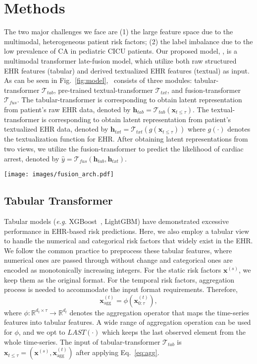 \section{Methods}
The two major challenges we face are (1) the large feature space due to the multimodal, heterogeneous patient risk factors; (2) the label imbalance due to the low prevalence of CA in pediatric CICU patients.  
Our proposed model, \modelname, is a multimodal transformer late-fusion model, which utilize both raw structured EHR features (tabular) and derived textualized EHR features (textual) as input. As can be seen in Fig.~\ref{fig:model}, \modelname ~consists of three modules: tabular-transformer $\mathcal{T}_{tab}$, pre-trained textual-transformer $\mathcal{T}_{txt}$, and fusion-transformer $\mathcal{T}_{fus}$. The tabular-transformer is corresponding to obtain latent representation from patient's raw EHR data, denoted by $\mathbf{h}_{tab}=\mathcal{T}_{tab}(\mathbf{x}_{t\leq \tau})$. The textual-transformer is corresponding to obtain latent representation from patient's textualized EHR data, denoted by $\mathbf{h}_{txt}=\mathcal{T}_{txt}(g(\mathbf{x}_{t\leq \tau}))$ where $g(\cdot)$ denotes the textualization function for EHR. After obtaining latent representations from two views, we utilize the fusion-transformer to predict the likelihood of cardiac arrest, denoted by $\hat{y}=\mathcal{T}_{fus}(\mathbf{h}_{tab},\mathbf{h}_{txt})$.

\begin{figure*}[ht!]
\centering
\texttt{[image: images/fusion\_arch.pdf]}
\caption{Model Architecture of \modelname.}
\vspace{-0.4cm}
\label{fig:model}
\end{figure*}

\subsection{Tabular Transformer}
Tabular models (\textit{e.g.} XGBoost~\cite{chen2016xgboost}, LightGBM) have demonstrated excessive performance in EHR-based risk predictions. Here, we also employ a tabular view to handle the numerical and categorical risk factors that widely exist in the EHR. We follow the common practice to preprocess these tabular features, where numerical ones are passed through without change and categorical ones are encoded as monotonically increasing integers. 
For the static risk factors $\mathbf{x}^{(s)}$, we keep them as the original format. For the temporal risk factors, aggregation process is needed to accommodate the input format requirements. Therefore, 
\begin{equation}
    \mathbf{x}^{(t)}_{\text{agg}} = \phi(\mathbf{x}^{(t)}_{0:\tau}),\label{eq:agg}
\end{equation}
where $\phi: \mathbb{R}^{d_t \times \tau}\rightarrow \mathbb{R}^{d_t}$ denotes the aggregation operator that maps the time-series features into tabular features. A wide range of aggregation operation can be used for $\phi$, and we opt to $LAST(\cdot)$ which keeps the last observed element from the whole time-series. The input of tabular-transformer $\mathcal{T}_{tab}$ is $\mathbf{x}_{t\leq\tau}=(\mathbf{x}^{(s)},\mathbf{x}^{(t)}_{\text{agg}})$ after applying Eq.~\eqref{eq:agg}. 

